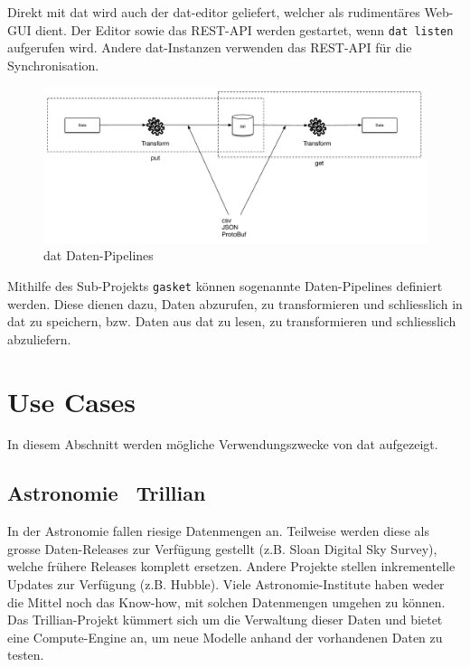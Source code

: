 Direkt mit dat wird auch der dat-editor geliefert, welcher als rudimentäres Web-GUI dient. Der Editor sowie das REST-API werden gestartet, wenn \texttt{dat listen} aufgerufen wird. Andere dat-Instanzen verwenden das REST-API für die Synchronisation.
\begin{figure}[H]
  \centering
  \includegraphics[width=\linewidth,clip]{fig/dat-pipeline}
  \caption{dat Daten-Pipelines}
  \label{fig:dat-architecture-pipeline}
\end{figure}

Mithilfe des Sub-Projekts \texttt{gasket} können sogenannte Daten-Pipelines definiert werden. Diese dienen dazu, Daten abzurufen, zu transformieren und schliesslich in dat zu speichern, bzw. Daten aus dat zu lesen, zu transformieren und schliesslich abzuliefern.

\section{Use Cases}
In diesem Abschnitt werden mögliche Verwendungszwecke von \gls{dat} aufgezeigt.

\subsection{Astronomie \textendash\ Trillian} 
In der Astronomie fallen riesige Datenmengen an. Teilweise werden diese als grosse Daten-Releases zur Verfügung gestellt (z.B. Sloan Digital Sky Survey), welche frühere Releases komplett ersetzen. Andere Projekte stellen inkrementelle Updates zur Verfügung (z.B. Hubble). Viele Astronomie-Institute haben weder die Mittel noch das Know-how, mit solchen Datenmengen umgehen zu können. Das Trillian-Projekt kümmert sich um die Verwaltung dieser Daten und bietet eine Compute-Engine an, um neue Modelle anhand der vorhandenen Daten zu testen.

